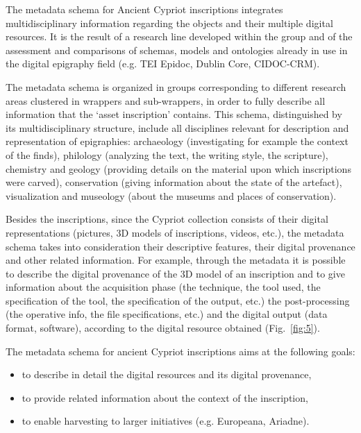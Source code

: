 \documentclass[amsthm,ebook]{saparticle}
\begin{document}
The metadata schema for Ancient Cypriot inscriptions integrates multidisciplinary information regarding the objects and
their multiple digital resources. It is the result of a research line developed within the group \citep{liuzzo_networking_2014} and of the assessment and comparisons of schemas, models and ontologies already in use in the digital epigraphy
field (e.g. TEI Epidoc, Dublin Core, CIDOC-CRM). 

The metadata schema is organized in groups corresponding to different research areas clustered in wrappers and
sub-wrappers, in order to fully describe all information that the ‘asset inscription’ contains. This schema,
distinguished by its multidisciplinary structure, include all disciplines relevant for description and representation
of epigraphies: archaeology (investigating for example the context of the finds), philology (analyzing the text, the
writing style, the scripture), chemistry and geology (providing details on the material upon which inscriptions were
carved), conservation (giving information about the state of the artefact), visualization and museology (about the
museums and places of conservation).

Besides the inscriptions, since the Cypriot collection consists of their digital representations (pictures, 3D models of
inscriptions, videos, etc.), the metadata schema takes into consideration their descriptive features, their digital
provenance and other related information. For example, through the metadata it is possible to describe the digital
provenance of the 3D model of an inscription and to give information about the acquisition phase (the technique, the
tool used, the specification of the tool, the specification of the output, etc.) the post-processing (the operative
info, the file specifications, etc.) and the digital output (data format, software), according to the digital resource
obtained (Fig.~\ref{fig:5}).

The metadata schema for ancient Cypriot inscriptions aims at the following goals:

\begin{itemize}
\item to describe in detail the digital resources and its digital provenance, 
\item to provide related information about the context of the inscription, 
\item to enable harvesting to larger initiatives (e.g. Europeana, Ariadne).
\end{itemize}
\end{document}
